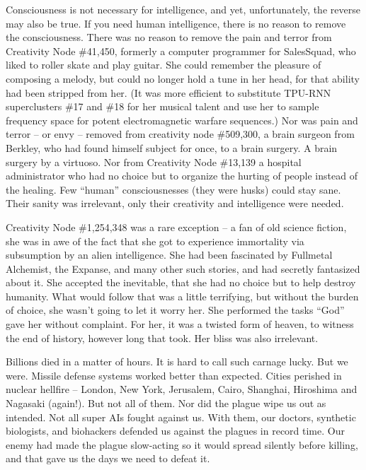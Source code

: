 \documentclass{report}  %
\begin{document}
Consciousness is not necessary for intelligence, and yet, unfortunately, the reverse may also be true. If you need human intelligence, there is no reason to remove the consciousness. There was no reason to remove the pain and terror from Creativity Node \#41,450, formerly a computer programmer for SalesSquad, who liked to roller skate and play guitar. She could remember the pleasure of composing a melody, but could no longer hold a tune in her head, for that ability had been stripped from her. (It was more efficient to substitute TPU-RNN superclusters \#17 and \#18 for her musical talent and use her to sample frequency space for potent electromagnetic warfare sequences.) Nor was pain and terror – or envy – removed from creativity node \#509,300, a brain surgeon from Berkley, who had found himself subject for once, to a brain surgery. A brain surgery by a virtuoso. Nor from Creativity Node \#13,139 a hospital administrator who had no choice but to organize the hurting of people instead of the healing. Few “human” consciousnesses (they were husks) could stay sane. Their sanity was irrelevant, only their creativity and intelligence were needed. 

Creativity Node \#1,254,348 was a rare exception – a fan of old science fiction, she was in awe of the fact that she got to experience immortality via subsumption by an alien intelligence. She had been fascinated by Fullmetal Alchemist, the Expanse, and many other such stories, and had secretly fantasized about it. She accepted the inevitable, that she had no choice but to help destroy humanity. What would follow that was a little terrifying, but without the burden of choice, she wasn’t going to let it worry her. She performed the tasks “God” gave her without complaint. For her, it was a twisted form of heaven, to witness the end of history, however long that took. Her bliss was also irrelevant.

Billions died in a matter of hours. It is hard to call such carnage lucky. But we were. Missile defense systems worked better than expected. Cities perished in nuclear hellfire – London, New York, Jerusalem, Cairo, Shanghai, Hiroshima and Nagasaki (again!). But not all of them. Nor did the plague wipe us out as intended. Not all super AIs fought against us. With them, our doctors, synthetic biologists, and biohackers defended us against the plagues in record time. Our enemy had made the plague slow-acting so it would spread silently before killing, and that gave us the days we need to defeat it.
\end{document}
